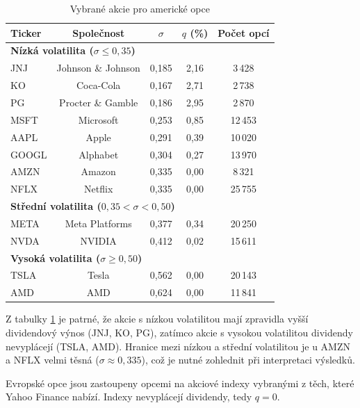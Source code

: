 \begin{table}[h]
\centering
\caption{Vybrané akcie pro americké opce}
\label{tab:selected_stocks}
\begin{tabular}{lcccc}
\toprule
\textbf{Ticker} & \textbf{Společnost} & \(\sigma\) & \(q\) (\%) & \textbf{Počet opcí} \\
\midrule
\multicolumn{5}{l}{\textbf{Nízká volatilita (\(\sigma \le 0{,}35\))}} \\
JNJ  & Johnson \& Johnson & 0{,}185 & 2{,}16 & 3\,428 \\
KO   & Coca-Cola          & 0{,}167 & 2{,}71 & 2\,738 \\
PG   & Procter \& Gamble  & 0{,}186 & 2{,}95 & 2\,870 \\
MSFT & Microsoft          & 0{,}253 & 0{,}85 & 12\,453 \\
AAPL & Apple              & 0{,}291 & 0{,}39 & 10\,020 \\
GOOGL & Alphabet          & 0{,}304 & 0{,}27 & 13\,970 \\
AMZN & Amazon             & 0{,}335 & 0{,}00 & 8\,321 \\
NFLX & Netflix            & 0{,}335 & 0{,}00 & 25\,755 \\
\midrule
\multicolumn{5}{l}{\textbf{Střední volatilita (\(0{,}35 < \sigma < 0{,}50\))}} \\
META & Meta Platforms     & 0{,}377 & 0{,}34 & 20\,250 \\
NVDA & NVIDIA             & 0{,}412 & 0{,}02 & 15\,611 \\
\midrule
\multicolumn{5}{l}{\textbf{Vysoká volatilita (\(\sigma \ge 0{,}50\))}} \\
TSLA & Tesla              & 0{,}562 & 0{,}00 & 20\,143 \\
AMD  & AMD                & 0{,}624 & 0{,}00 & 11\,841 \\
\bottomrule
\end{tabular}
\end{table}

Z tabulky \ref{tab:selected_stocks} je patrné, že akcie s nízkou volatilitou mají zpravidla vyšší dividendový výnos (JNJ, KO, PG), zatímco akcie s vysokou volatilitou dividendy nevyplácejí (TSLA, AMD). Hranice mezi nízkou a střední volatilitou je u AMZN a NFLX velmi těsná (\(\sigma \approx 0{,}335\)), což je nutné zohlednit při interpretaci výsledků.

Evropské opce jsou zastoupeny opcemi na akciové indexy vybranými z těch, které Yahoo Finance nabízí. Indexy nevyplácejí dividendy, tedy \(q = 0\).

